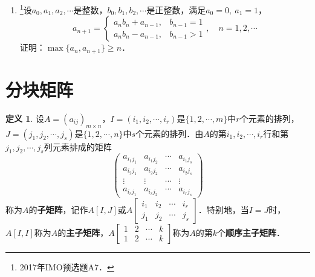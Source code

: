 \documentclass[a4paper,fontset=windows]{ctexbook}
\theoremstyle{definition}
\newtheorem{definition}{定义}[chapter]
\renewcommand{\ge}{\geqslant}
\begin{document}
\begin{enumerate}

\item \footnote{2017年IMO预选题A7．}设$a_0,a_1,a_2,\cdots$是整数，$b_0,b_1,b_2,\cdots$是正整数，满足$a_0=0,~a_1=1$，
$$a_{n+1}=\begin{cases}a_nb_n+a_{n-1},&b_{n-1}=1 \\ a_nb_n-a_{n-1},&b_{n-1}>1\end{cases},\quad n=1,2,\cdots$$
证明：$\max\{a_n,a_{n+1}\}\ge n$．

\end{enumerate}

\clearpage\section{分块矩阵}

\begin{definition}
设$A=(a_{ij})_{m\times n}$，$I=(i_1,i_2,\cdots,i_r)$是$\{1,2,\cdots,m\}$中$r$个元素的排列，$J=(j_1,j_2,\cdots,j_s)$是$\{1,2,\cdots,n\}$中$s$个元素的排列．由$A$的第$i_1,i_2,\cdots,i_r$行和第$j_1,j_2,\cdots,j_s$列元素排成的矩阵
$$\begin{pmatrix}a_{i_1j_1}&a_{i_1j_2}&\cdots&a_{i_1j_s} \\ a_{i_2j_1}&a_{i_2j_2}&\cdots&a_{i_2j_s} \\ \vdots&\vdots&\cdots&\vdots \\ a_{i_rj_1}&a_{i_rj_2}&\cdots&a_{i_rj_s}\end{pmatrix}$$
称为$A$的{\bf 子矩阵}，记作$A[I,J]$或$A[\begin{smallmatrix}i_1&i_2&\cdots&i_r \\ j_1&j_2&\cdots&j_s\end{smallmatrix}]$．特别地，当$I=J$时，$A[I,I]$称为$A$的{\bf 主子矩阵}，$A[\begin{smallmatrix}1&2&\cdots&k \\ 1&2&\cdots&k\end{smallmatrix}]$称为$A$的第$k$个{\bf 顺序主子矩阵}．
\end{definition}
\end{document}
